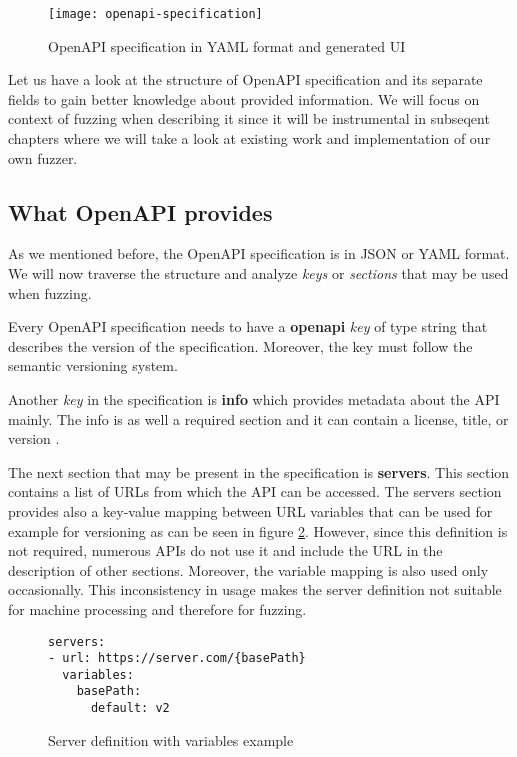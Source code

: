 \begin{figure}[h]
  \texttt{[image: openapi-specification]}
  \caption{OpenAPI specification in YAML format and generated UI}
  \label{fig:openapi-specification}
\end{figure}

Let us have a look at the structure of OpenAPI specification and its separate fields to gain better knowledge about provided information. We will focus on context of fuzzing when describing it since it will be instrumental in subseqent chapters where we will take a look at existing work and implementation of our own fuzzer.

\subsection{What OpenAPI provides}
As we mentioned before, the OpenAPI specification is in JSON or YAML format. We will now traverse the structure and analyze \textit{keys} or \textit{sections} that may be used when fuzzing.

Every OpenAPI specification needs to have a \textbf{openapi} \textit{key} of type string that describes the version of the specification. Moreover, the key must follow the semantic versioning system.

Another \textit{key} in the specification is \textbf{info} which provides metadata about the API mainly. The info is as well a required section and it can contain a license, title, or version \cite{openapi2020github}.

The next section that may be present in the specification is \textbf{servers}. This section contains a list of URLs from which the API can be accessed. The servers section provides also a key-value mapping between URL variables that can be used for example for versioning as can be seen in figure \ref{fig:Server definition with variables}. However, since this definition is not required, numerous APIs do not use it and include the URL in the description of other sections. Moreover, the variable mapping is also used only occasionally. This inconsistency in usage makes the server definition not suitable for machine processing and therefore for fuzzing.

\begin{figure}[h]
  \begin{verbatim}
servers:
- url: https://server.com/{basePath}
  variables:
    basePath:
      default: v2
  \end{verbatim}
  \caption{Server definition with variables example}
  \label{fig:Server definition with variables}
\end{figure}

